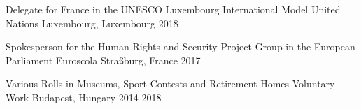 

\begin{cventries}

  \cventry
    {Delegate for France in the UNESCO} %
    {Luxembourg International Model United Nations} %
    {Luxembourg, Luxembourg} %
    {2018} %
    {}
  
  
  \cventry
    {Spokesperson for the Human Rights and Security Project Group in the European Parliament} %
    {Euroscola} %
    {Straßburg, France} %
    {2017} %
    {}
     
  
 \cventry
    {Various Rolls in Museums, Sport Contests and Retirement Homes} %
    {Voluntary Work} %
    {Budapest, Hungary} %
    {2014-2018} %
    {}
    


\end{cventries}
